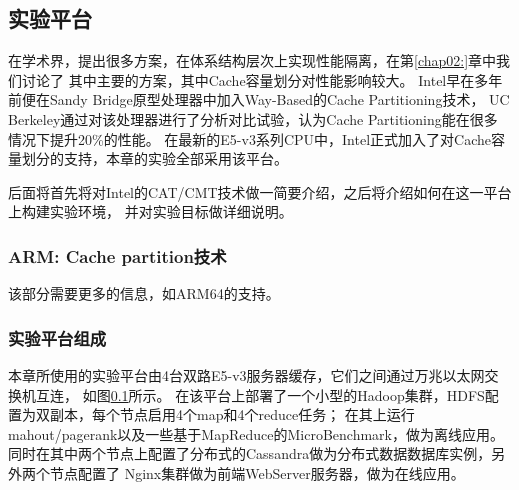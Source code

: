 \subsection{实验平台}

在学术界，提出很多方案，在体系结构层次上实现性能隔离，在第\ref{chap02:}章中我们讨论了
其中主要的方案，其中Cache容量划分对性能影响较大。
Intel早在多年前便在Sandy Bridge原型处理器中加入Way-Based的Cache Partitioning技术，
UC Berkeley通过对该处理器进行了分析对比试验，认为Cache Partitioning能在很多
情况下提升20\%的性能。
在最新的E5-v3系列CPU中，Intel正式加入了对Cache容量划分的支持，本章的实验全部采用该平台。

后面将首先将对Intel的CAT/CMT技术做一简要介绍，之后将介绍如何在这一平台上构建实验环境，
并对实验目标做详细说明。




%

\subsubsection*{ARM: Cache partition技术}

该部分需要更多的信息，如ARM64的支持。


\subsubsection*{实验平台组成}

本章所使用的实验平台由4台双路E5-v3服务器缓存，它们之间通过万兆以太网交换机互连，
如图\ref{}所示。
在该平台上部署了一个小型的Hadoop集群，HDFS配置为双副本，每个节点启用4个map和4个reduce任务；
在其上运行mahout/pagerank以及一些基于MapReduce的MicroBenchmark，做为离线应用。
同时在其中两个节点上配置了分布式的Cassandra做为分布式数据数据库实例，另外两个节点配置了
Nginx集群做为前端WebServer服务器，做为在线应用。


